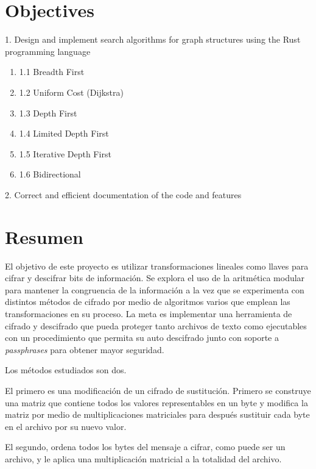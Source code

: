 \vfill

\newpage
\tableofcontents

\newpage
\section{Objectives}

1. Design and implement search algorithms for graph structures using
the Rust programming language

\begin{enumerate}[label={}]
\item 1.1 Breadth First
\item 1.2 Uniform Cost (Dijkstra)
\item 1.3 Depth First
\item 1.4 Limited Depth First
\item 1.5 Iterative Depth First
\item 1.6 Bidirectional
\end{enumerate}



2. Correct and efficient documentation of the code and features


\section{Resumen}

El objetivo de este proyecto es utilizar transformaciones lineales como llaves
para cifrar y descifrar bits de información.
Se explora el uso de la aritmética modular para mantener la congruencia de la
información
 a la vez que se experimenta con distintos métodos de cifrado por medio de
algoritmos varios que emplean las transformaciones en su proceso.
La meta es implementar una herramienta de cifrado y descifrado que pueda
proteger tanto archivos de texto como ejecutables con un procedimiento
que permita su auto descifrado junto con soporte a \textit{passphrases} para
obtener mayor seguridad.

Los métodos estudiados son dos. 

El primero es una modificación de un cifrado de sustitución. Primero se
construye una matriz que contiene todos los valores representables en un 
byte y modifica la matriz por medio de multiplicaciones matriciales para
después sustituir cada byte en el archivo por su nuevo valor. 

El segundo, ordena todos los bytes del mensaje a cifrar, como puede ser un
archivo, y le aplica una multiplicación matricial a la totalidad del archivo. 

